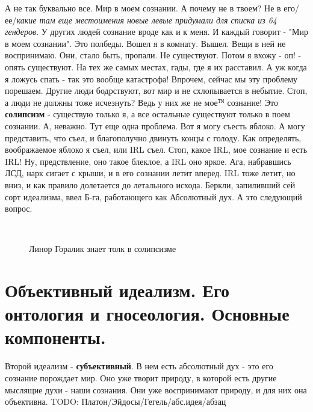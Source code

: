 А не так буквально все. Мир в моем сознании. А почему не в твоем? Не в его/ее/\textit{какие там еще местоимения новые левые придумали для списка из 64 гендеров}. У других людей сознание вроде как и к меня. И каждый говорит - "Мир в моем сознании". Это полбеды. Вошел я в комнату. Вышел. Вещи в ней не воспринимаю. Они, стало быть, пропали. Не существуют. Потом я вхожу - оп! - опять существуют. На тех же самых местах, гады, где я их расставил. А уж когда я ложусь спать - так это вообще катастрофа! Впрочем, сейчас мы эту проблему порешаем. Другие люди бодрствуют, вот мир и не схлопывается в небытие. Стоп, а люди не должны тоже исчезнуть? Ведь у них же не мое${}^\mathtt{TM}$ сознание! Это \textbf{солипсизм} - существую только я, а все остальные существуют только в поем сознании. А, неважно. Тут еще одна проблема. Вот я могу съесть яблоко. А могу представить, что съел, и благополучно двинуть концы с голоду. Как определять, воображаемое яблоко я съел, или IRL съел. Стоп, какое IRL, мое сознание и есть IRL! Ну, предствление, оно такое блеклое, а IRL оно яркое. Ага, набравшись ЛСД, нарк сигает с крыши, и в его сознании летит вперед. IRL тоже летит, но вниз, и как правило долетается до летального исхода. Беркли, запиливший сей сорт идеализма, ввел Б-га, работающего как Абсолютный дух. А это следующий вопрос. 

\begin{figure}[h]
\\
\caption{Линор Горалик знает толк в солипсизме}
\end{figure}

\section{ Объективный идеализм. Его онтология и гносеология. Основные компоненты.}
Второй идеализм - \textbf{субъективный}. В нем есть абсолютный дух - это его сознание порождает мир. Оно уже творит природу, в которой есть другие мыслящие духи - наши сознания. Они уже воспринимают природу, и для них она объективна.
TODO: Платон/Эйдосы/Гегель/абс.идея/абзац

